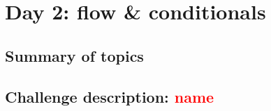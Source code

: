 \chapter{Day 2: flow \& conditionals}

\section{Summary of topics}

\section{Challenge description: \textcolor{red}{name}}
